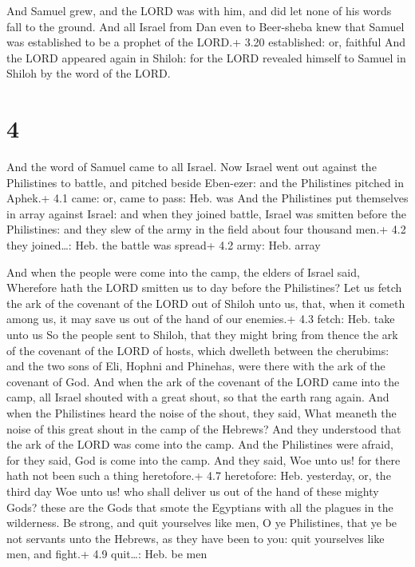  And Samuel grew, and the LORD was with him, and did let
none of his words fall to the ground.  And all Israel from
Dan even to Beer-sheba knew that Samuel was established to be a prophet
of the LORD.+ 3.20 established: or, faithful  And the LORD
appeared again in Shiloh: for the LORD revealed himself to Samuel in
Shiloh by the word of the LORD.

\hypertarget{section-3}{%
\section{4}\label{section-3}}

 And the word of Samuel came to all Israel. Now Israel went
out against the Philistines to battle, and pitched beside Eben-ezer: and
the Philistines pitched in Aphek.+ 4.1 came: or, came to pass: Heb. was
 And the Philistines put themselves in array against Israel:
and when they joined battle, Israel was smitten before the Philistines:
and they slew of the army in the field about four thousand men.+ 4.2
they joined\ldots: Heb. the battle was spread+ 4.2 army: Heb. array

 And when the people were come into the camp, the elders
of Israel said, Wherefore hath the LORD smitten us to day before the
Philistines? Let us fetch the ark of the covenant of the LORD out of
Shiloh unto us, that, when it cometh among us, it may save us out of the
hand of our enemies.+ 4.3 fetch: Heb. take unto us  So the
people sent to Shiloh, that they might bring from thence the ark of the
covenant of the LORD of hosts, which dwelleth between the cherubims: and
the two sons of Eli, Hophni and Phinehas, were there with the ark of the
covenant of God.  And when the ark of the covenant of the
LORD came into the camp, all Israel shouted with a great shout, so that
the earth rang again.  And when the Philistines heard the
noise of the shout, they said, What meaneth the noise of this great
shout in the camp of the Hebrews? And they understood that the ark of
the LORD was come into the camp.  And the Philistines were
afraid, for they said, God is come into the camp. And they said, Woe
unto us! for there hath not been such a thing heretofore.+ 4.7
heretofore: Heb. yesterday, or, the third day  Woe unto us!
who shall deliver us out of the hand of these mighty Gods? these are the
Gods that smote the Egyptians with all the plagues in the wilderness.
 Be strong, and quit yourselves like men, O ye Philistines,
that ye be not servants unto the Hebrews, as they have been to you: quit
yourselves like men, and fight.+ 4.9 quit\ldots: Heb. be men

